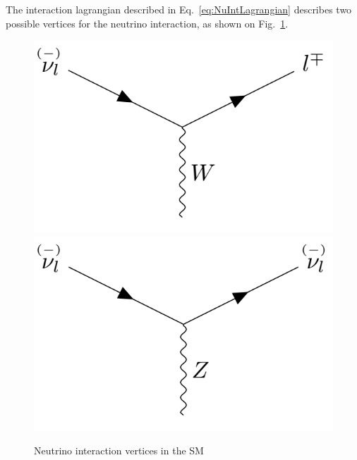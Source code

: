 The interaction lagrangian described in Eq.~\ref{eq:NuIntLagrangian} describes two possible vertices for the neutrino interaction, as shown on Fig.~\ref{fig:FeynmanNuIntVertices}.

\begin{figure}[hbtp]
\centering
\includegraphics[width=0.4\linewidth]{Plots/Theory/NeutrinoCCInteractionVertices.png}
\hspace{0.1\linewidth}
\includegraphics[width=0.4\linewidth]{Plots/Theory/NeutrinoNCInteractionVertices.png}
\caption{Neutrino interaction vertices in the \acrshort{SM}}
\label{fig:FeynmanNuIntVertices}
\end{figure}




